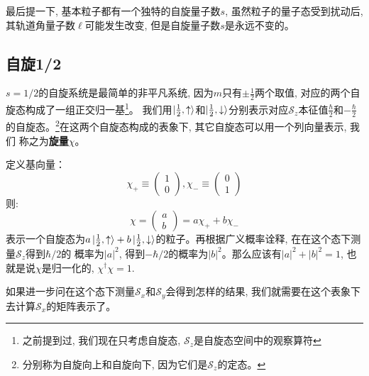 \documentclass[a4paper,zihao=-4,linespread=1]{ctexrep}
\begin{document}
    最后提一下, 基本粒子都有一个独特的自旋量子数$s$, 虽然粒子的量子态受到扰动后, 其轨道角量子数$\ell$可能发生改变, 但是自旋量子数$s$是永远不变的。

    \subsection{自旋1/2}
    $s=1/2$的自旋系统是最简单的非平凡系统, 因为$m$只有$\pm\frac{1}{2}$两个取值, 对应的两个自旋态构成了一组正交归一基\footnote{之前提到过, 我们现在只考虑自旋态, $\mathcal{S}_z$是自旋态空间中的观察算符}。
    我们用$\ket{\frac{1}{2}, \uparrow}$和$\ket{\frac{1}{2},\downarrow}$分别表示对应$\mathcal{S}_z$本征值$\frac{\hbar}{2}$和$-\frac{\hbar}{2}$的自旋态。\footnote{分别称为自旋向上和自旋向下, 因为它们是$\mathcal{S}_z$的定态。}在这两个自旋态构成的表象下, 其它自旋态可以用一个列向量表示, 我们
    称之为\textbf{旋量}$\chi$。

    定义基向量：
    \begin{equation}
        \chi_+\equiv\begin{pmatrix}
            1\\0
        \end{pmatrix},\chi_-\equiv\begin{pmatrix}
            0\\1
        \end{pmatrix}
    \end{equation}
    则:
    \begin{equation}
        \chi =\begin{pmatrix}
            a\\b
        \end{pmatrix}=a\chi_++b\chi_-
    \end{equation}
    表示一个自旋态为$a\ket{\frac{1}{2},\uparrow}+b\ket{\frac{1}{2},\downarrow}$的粒子。再根据广义概率诠释, 在在这个态下测量$\mathcal{S}_z$得到$\hbar/2$的
    概率为$|a|^2$, 得到$-\hbar/2$的概率为$|b|^2$。那么应该有$|a|^2+|b|^2=1$, 也就是说$\chi $是归一化的, $\chi^\dagger\chi=1$.

    如果进一步问在这个态下测量$\mathcal{S}_x$和$\mathcal{S}_y$会得到怎样的结果, 我们就需要在这个表象下去计算$\mathcal{S}_x$的矩阵表示了。
\end{document}
